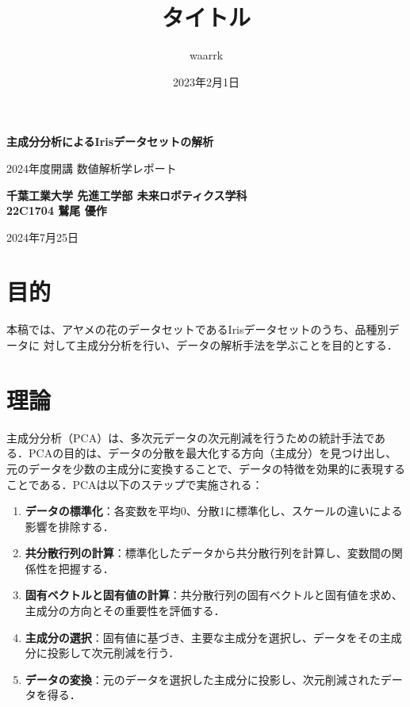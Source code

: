 \documentclass[dvipdfmx,titlepage,a4j]{jsarticle}
\title{タイトル}
\author{waarrk}
\date{2023年2月1日}
\begin{document}
\begin{titlepage}
    \centering
    \vspace*{2cm}

    \vspace{1cm}

    {\LARGE \textbf{主成分分析によるIrisデータセットの解析}}

    \vspace{0.5cm}

    {\LARGE 2024年度開講 数値解析学レポート}

    \vspace{1.5cm}

    {\textbf{千葉工業大学 先進工学部 未来ロボティクス学科}\\}
    {\textbf{22C1704 鷲尾 優作}}

    \vfill

    {\large 2024年7月25日}

    \vspace{1cm}
\end{titlepage}

\section{目的}
本稿では、アヤメの花のデータセットであるIrisデータセットのうち、品種別データに
対して主成分分析を行い、データの解析手法を学ぶことを目的とする．

\section{理論}

主成分分析（PCA）は、多次元データの次元削減を行うための統計手法である．PCAの目的は、データの分散を最大化する方向（主成分）を見つけ出し、元のデータを少数の主成分に変換することで、データの特徴を効果的に表現することである．PCAは以下のステップで実施される：

\begin{enumerate}
    \item \textbf{データの標準化}：各変数を平均0、分散1に標準化し、スケールの違いによる影響を排除する．
    \item \textbf{共分散行列の計算}：標準化したデータから共分散行列を計算し、変数間の関係性を把握する．
    \item \textbf{固有ベクトルと固有値の計算}：共分散行列の固有ベクトルと固有値を求め、主成分の方向とその重要性を評価する．
    \item \textbf{主成分の選択}：固有値に基づき、主要な主成分を選択し、データをその主成分に投影して次元削減を行う．
    \item \textbf{データの変換}：元のデータを選択した主成分に投影し、次元削減されたデータを得る．
\end{enumerate}
\end{document}
